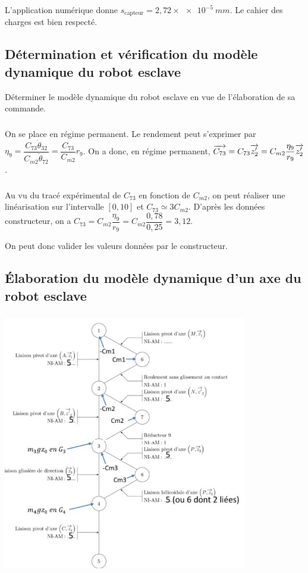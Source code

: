 \documentclass[10pt,fleqn]{article} %
\begin{document}
L'application numérique donne $s_{\text{capteur}}=2,72\times \SI{e-5}{mm}$. Le cahier des charges est bien respecté.


\subsection{Détermination et vérification du modèle dynamique du robot esclave}
\begin{obj}
Déterminer le modèle dynamique du robot esclave en vue de l’élaboration de sa commande.
\end{obj}

\subparagraph{}%
On se place en régime permanent. Le rendement peut s'exprimer par 
$\eta_9 =\dfrac{C_{73}\dot{\theta}_{32}}{C_{m2}\dot{\theta}_{72}}=\dfrac{C_{73}}{C_{m2}}r_9$. 
On a donc, en régime permanent, $\overrightarrow{C_{73}}=C_{73}\overrightarrow{z'_2}=C_{m2}\dfrac{\eta_9}{r_9}\overrightarrow{z'_2}$.


\subparagraph{}%
Au vu du tracé expérimental de $C_{73}$ en fonction de $C_{m2}$, on peut réaliser une linéarisation sur l'intervalle $[0,10]$ et $C_{73}\simeq 3 C_{m2}$. 
D'après les données constructeur, on a $C_{73}=C_{m2}\dfrac{\eta_9}{r_9}=C_{m2}\dfrac{0,78}{0,25}=3,12$.

On peut donc valider les valeurs données par le constructeur.
\subsection{Élaboration du modèle dynamique d’un axe du robot esclave}


\subparagraph{}%

\begin{center}
\includegraphics[width=0.8\textwidth]{images/graphe_structure_complet.jpg}
\end{center}
\subparagraph{}%
\end{document}
